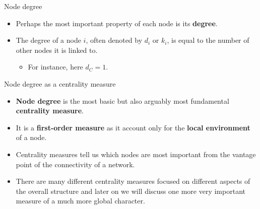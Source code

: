 \documentclass[
    hyperref={colorlinks,linkcolor=blue,urlcolor=blue,citecolor=blue}
]{beamer}
\begin{document}
\begin{frame}{Node degree}
\begin{itemize}
    \item<2-> Perhaps the most important property of each node is its \textbf{degree}.
    \item<3-> The degree of a node $i$, often denoted by $d_i$ or $k_i$,
    is equal to the number of other nodes it is linked to.
    \pause
    \begin{center}
    \end{center}
    \begin{itemize}
        \item<5-> For instance, here $d_C = 1$.
    \end{itemize}
\end{itemize}
\end{frame}

\begin{frame}{Node degree as a centrality measure}
\begin{itemize}
    \item<2-> \textbf{Node degree} is the most basic but also arguably most
    fundamental \textbf{centrality measure}.
    \item<3-> It is a \textbf{first-order measure} as it account only for the
    \textbf{local environment} of a node.
    \item<4-> Centrality measures tell us which nodes are most important
    from the vantage point of the connectivity of a network.
    \item<5-> There are many different centrality measures focused on different
    aspects of the overall structure and later on we will discuss one more
    very important measure of a much more global character.
\end{itemize}
\end{frame}
\end{document}
